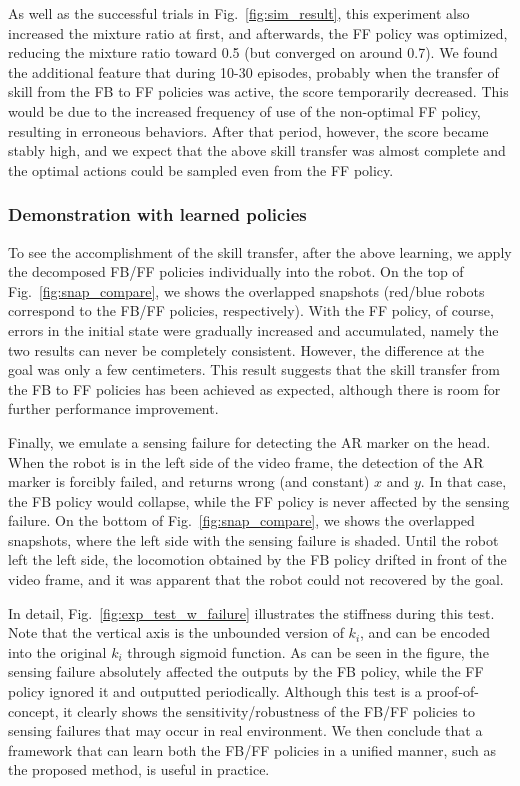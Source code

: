 \documentclass{bmcart}
\begin{document}
As well as the successful trials in Fig.~\ref{fig:sim_result}, this experiment also increased the mixture ratio at first, and afterwards, the FF policy was optimized, reducing the mixture ratio toward 0.5 (but converged on around 0.7).
We found the additional feature that during 10-30 episodes, probably when the transfer of skill from the FB to FF policies was active, the score temporarily decreased.
This would be due to the increased frequency of use of the non-optimal FF policy, resulting in erroneous behaviors.
After that period, however, the score became stably high, and we expect that the above skill transfer was almost complete and the optimal actions could be sampled even from the FF policy.

\subsubsection{Demonstration with learned policies}

To see the accomplishment of the skill transfer, after the above learning, we apply the decomposed FB/FF policies individually into the robot.
On the top of Fig.~\ref{fig:snap_compare}, we shows the overlapped snapshots (red/blue robots correspond to the FB/FF policies, respectively).
With the FF policy, of course, errors in the initial state were gradually increased and accumulated, namely the two results can never be completely consistent.
However, the difference at the goal was only a few centimeters.
This result suggests that the skill transfer from the FB to FF policies has been achieved as expected, although there is room for further performance improvement.

Finally, we emulate a sensing failure for detecting the AR marker on the head.
When the robot is in the left side of the video frame, the detection of the AR marker is forcibly failed, and returns wrong (and constant) $x$ and $y$.
In that case, the FB policy would collapse, while the FF policy is never affected by the sensing failure.
On the bottom of Fig.~\ref{fig:snap_compare}, we shows the overlapped snapshots, where the left side with the sensing failure is shaded.
Until the robot left the left side, the locomotion obtained by the FB policy drifted in front of the video frame, and it was apparent that the robot could not recovered by the goal.

In detail, Fig.~\ref{fig:exp_test_w_failure} illustrates the stiffness during this test.
Note that the vertical axis is the unbounded version of $k_i$, and can be encoded into the original $k_i$ through sigmoid function.
As can be seen in the figure, the sensing failure absolutely affected the outputs by the FB policy, while the FF policy ignored it and outputted periodically.
Although this test is a proof-of-concept, it clearly shows the sensitivity/robustness of the FB/FF policies to sensing failures that may occur in real environment.
We then conclude that a framework that can learn both the FB/FF policies in a unified manner, such as the proposed method, is useful in practice.
\end{document}
